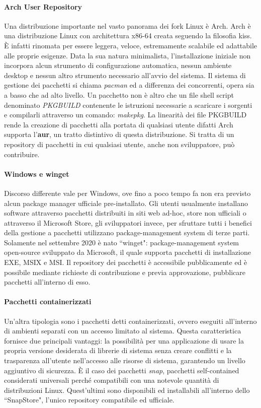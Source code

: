 \paragraph{Arch User Repository} Una distribuzione importante nel vasto panorama dei fork Linux è Arch. Arch è una distribuzione Linux con architettura x86-64 creata seguendo la filosofia \ac{kiss}. È infatti rinomata per essere leggera, veloce, estremamente scalabile ed adattabile alle proprie esigenze. Data la sua natura minimalista, l'installazione iniziale non incorpora alcun strumento di configurazione automatica, nessun ambiente desktop e nessun altro strumento necessario all'avvio del sistema. Il sistema di gestione dei pacchetti si chiama \textit{pacman} ed a differenza dei concorrenti, opera sia a basso che ad alto livello. Un pacchetto non è altro che un file shell script denominato \textit{PKGBUILD} contenente le istruzioni necessarie a scaricare i sorgenti e compilarli attraverso un comando: \textit{makepkg}. La linearità dei file PKGBUILD rende la creazione di pacchetti alla portata di qualsiasi utente difatti Arch supporta l'\textbf{\ac{aur}}, un tratto distintivo di questa distribuzione. Si tratta di un repository di pacchetti in cui qualsiasi utente, anche non sviluppatore, può contribuire.  

\paragraph{Windows e winget} Discorso differente vale per Windows, ove fino a poco tempo fa non era previsto alcun package manager ufficiale pre-installato. Gli utenti usualmente installano software attraverso pacchetti distribuiti in siti web ad-hoc, store non ufficiali o attraverso il Microsoft Store, gli sviluppatori invece, per sfruttare tutti i benefici della gestione a pacchetti utilizzano package-management system di terze parti. Solamente nel settembre 2020 è nato ``winget": package-management system open-source sviluppato da Microsoft, il quale supporta pacchetti di installazione EXE, MSIX e MSI. Il repository dei pacchetti è accessibile pubblicamente ed è possibile mediante richieste di contribuzione e previa approvazione, pubblicare pacchetti all'interno di esso.

\paragraph{Pacchetti containerizzati} Un'altra tipologia sono i pacchetti detti containerizzati, ovvero eseguiti all'interno di ambienti separati con un accesso limitato al sistema. Questa caratteristica fornisce due principali vantaggi: la possibilità per una applicazione di usare la propria versione desiderata di librerie di sistema senza creare conflitti e la trasparenza all'utente nell'accesso alle risorse di sistema, garantendo un livello aggiuntivo di sicurezza. È il caso dei pacchetti \textit{snap}, pacchetti self-contained considerati universali perché compatibili con una notevole quantità di distribuzioni Linux. Quest'ultimi sono disponibili ed installabili all'interno dello ``SnapStore", l'unico repository compatibile ed ufficiale.

